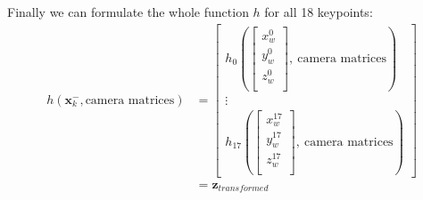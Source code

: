 Finally we can formulate the whole function $h$ for all 18 keypoints:
\begin{align}
h(\mathbf{x}^-_k, \text{camera matrices}) 
&= 
\begin{bmatrix}
h_0(\begin{bmatrix}
x^0_w \\
y^0_w \\
z^0_w \\
\end{bmatrix},\ \text{camera matrices})\\
\vdots \\
h_{17}(\begin{bmatrix}
x^{17}_w \\
y^{17}_w \\
z^{17}_w \\
\end{bmatrix},\ \text{camera matrices}) 
\end{bmatrix}\\
&= \mathbf{z}_{transformed}
\end{align}

